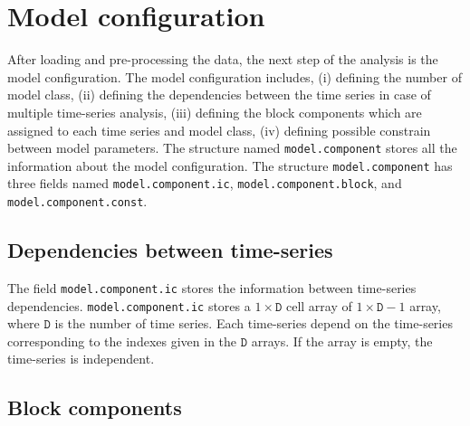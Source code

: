 \section{Model configuration}
\label{S:MODELCONFIGURATION}
After loading and pre-processing the data, the next step of the analysis is the model configuration.
The model configuration includes, (i) defining the number of model class, (ii) defining the dependencies between the time series in case of multiple time-series analysis, (iii) defining the block components which are assigned to each time series and model class, (iv) defining possible constrain between model parameters.
The \MATLAB{} structure named \lstinline[basicstyle = \mlttfamily]!model.component! stores all the information about the model configuration.
The structure \lstinline[basicstyle = \mlttfamily]!model.component! has three fields named  \lstinline[basicstyle = \mlttfamily]!model.component.ic!, \lstinline[basicstyle = \mlttfamily]!model.component.block!, and \lstinline[basicstyle = \mlttfamily]!model.component.const!.

\subsection{Dependencies between time-series}

The field \lstinline[basicstyle = \mlttfamily]!model.component.ic! stores the information between time-series dependencies.
\lstinline[basicstyle = \mlttfamily \small ]!model.component.ic! stores a $1\times \mathtt{D}$ cell array of $1\times \mathtt{D}-1$ array, where $\mathtt{D}$ is the number of time series.
Each time-series depend on the time-series corresponding to the indexes given in the $\mathtt{D}$ arrays.
If the array is empty, the time-series is independent.

\subsection{Block components}

